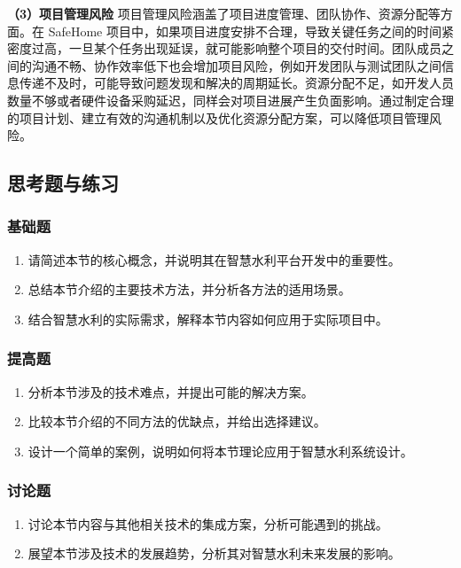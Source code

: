 \textbf{（3）项目管理风险} 项目管理风险涵盖了项目进度管理、团队协作、资源分配等方面。在 SafeHome
项目中，如果项目进度安排不合理，导致关键任务之间的时间紧密度过高，一旦某个任务出现延误，就可能影响整个项目的交付时间。团队成员之间的沟通不畅、协作效率低下也会增加项目风险，例如开发团队与测试团队之间信息传递不及时，可能导致问题发现和解决的周期延长。资源分配不足，如开发人员数量不够或者硬件设备采购延迟，同样会对项目进展产生负面影响。通过制定合理的项目计划、建立有效的沟通机制以及优化资源分配方案，可以降低项目管理风险。
\subsection{思考题与练习}\label{ux601dux8003ux9898ux4e0eux7ec3ux4e60-1} \subsubsection{基础题}\label{ux57faux7840ux9898-1}
\begin{enumerate} \def\labelenumi{\arabic{enumi}.} \tightlist \item 请简述本节的核心概念，并说明其在智慧水利平台开发中的重要性。 \item
总结本节介绍的主要技术方法，并分析各方法的适用场景。 \item 结合智慧水利的实际需求，解释本节内容如何应用于实际项目中。 \end{enumerate}
\subsubsection{提高题}\label{ux63d0ux9ad8ux9898-1} \begin{enumerate} \def\labelenumi{\arabic{enumi}.} \tightlist \item
分析本节涉及的技术难点，并提出可能的解决方案。 \item 比较本节介绍的不同方法的优缺点，并给出选择建议。 \item 设计一个简单的案例，说明如何将本节理论应用于智慧水利系统设计。 \end{enumerate}
\subsubsection{讨论题}\label{ux8ba8ux8bbaux9898-1} \begin{enumerate} \def\labelenumi{\arabic{enumi}.} \tightlist \item
讨论本节内容与其他相关技术的集成方案，分析可能遇到的挑战。 \item 展望本节涉及技术的发展趋势，分析其对智慧水利未来发展的影响。 \end{enumerate}
